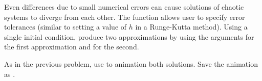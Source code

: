 \begin{problem}
Even differences due to small numerical errors can cause solutions of chaotic systems to diverge from each other.
The  function allows user to specify error tolerances (similar to setting a value of $h$ in a Runge-Kutta method). 
Using a single initial condition, produce two approximations by using the  arguments  for the first approximation and  for the second.

As in the previous problem, use  to animation both solutions. Save the animation as .
\end{problem}

